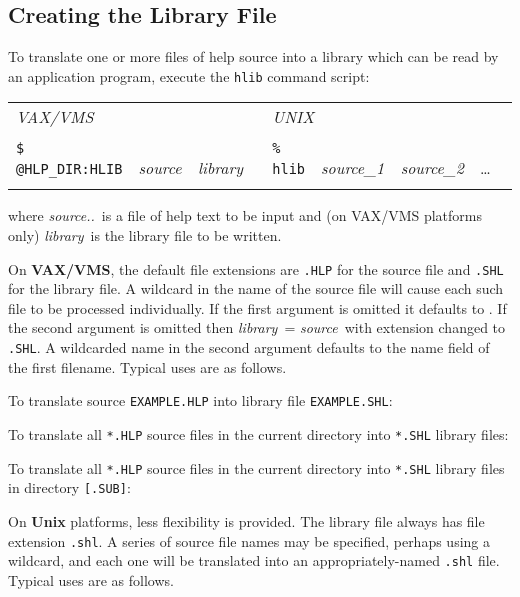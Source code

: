 \documentclass[11pt,nolof]{starlink}
\providecommand{\qt}[1]{``{\tt{#1}}''}
\providecommand{\fstring}[1]{\hbox{\hspace{0.05em}{\qt{#1}}\hspace{0.05em}}}
\begin{document}
\subsection{Creating the Library File}
To translate one or more files of help source into a library which can be
read by an application program, execute the \texttt{hlib} command script:

\begin{tabular}{ll}
\\
\textit{VAX/VMS} & \textit{UNIX} \\ \\
\texttt{\$ @HLP\_DIR:HLIB}~~\textit{source~~library} &
   \texttt{\% hlib}~~\textit{source\_1~~source\_2}~~\ldots \\ \\
\end{tabular}

where \textit{source..}\ is a file of help text to be
input and (on VAX/VMS
platforms only) \textit{library}\, is the library file to be written.

On \textbf{VAX/VMS}, the default file extensions are \texttt{.HLP} for the
source file and \texttt{.SHL} for the library file.  A wildcard in the name
of the source file will cause each such file to be processed
individually.  If the first argument is omitted it defaults to
\fstring{*}.  If the second argument is omitted then
\textit{library}\, = \textit{source}\, with
extension changed to \texttt{.SHL}.  A wildcarded name in the second argument
defaults to the name field of the first filename.  Typical uses are
as follows.

To translate source \texttt{EXAMPLE.HLP} into library file \texttt{EXAMPLE.SHL}:
To translate all \texttt{*.HLP} source files in the current directory
into \texttt{*.SHL} library files:
\begin{terminalv}
$ @HLP_DIR:HLIB}
\end{terminalv}
To translate all \texttt{*.HLP} source files in the current directory into
\texttt{*.SHL} library files in directory \texttt{[.SUB]}:

On \textbf{Unix} platforms, less flexibility is provided.  The library
file always has file extension \texttt{.shl}.  A series of source file names
may be specified, perhaps using a wildcard, and each one will be
translated into an appropriately-named \texttt{.shl} file.  Typical uses are
as follows.
\end{document}
